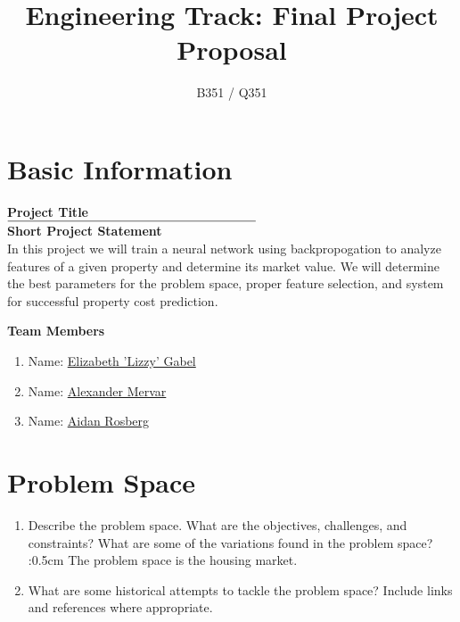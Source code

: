 \documentclass[]{article}
\title{\vspace{-2.5cm}Engineering Track: Final Project Proposal}
\author{B351 / Q351}
\date{}
\begin{document}
\maketitle

\section*{Basic Information}

\begin{multicols}{2}
	
\textbf{Project Title}\\

\vspace{0.25cm}
$\rule{7cm}{0.15mm}$\\

\textbf{Short Project Statement}\\
In this project we will train a neural network using backpropogation to analyze features of a given property and determine its market value.  We will determine the best parameters for the problem space, proper feature selection, and system for successful property cost prediction.

\columnbreak
\textbf{Team Members}
\begin{enumerate}
	
	\vspace{0.5cm}
	\item Name: \underline{Elizabeth 'Lizzy' Gabel}
	
	\vspace{1cm}
	\item Name: \underline{Alexander Mervar}
	
	\vspace{1cm}
	\item Name: \underline{Aidan Rosberg}
	
	
\end{enumerate}

\end{multicols}

\section{Problem Space}
\begin{enumerate}
	\item Describe the problem space. What are the objectives, challenges, and constraints? What are some of the variations found in the problem space?
	\vspace:{0.5cm}
	The problem space is the housing market.

	\item What are some historical attempts to tackle the problem space? Include links and references where appropriate.
\end{enumerate}
\end{document}
